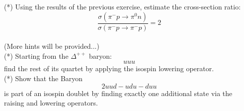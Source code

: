 \documentclass[12pt]{article}
\begin{document}
\exercise (*) Using the results of the previous exercise, estimate the cross-section ratio:
\begin{equation*}
  \frac{\sigma(\pi^- p \to \pi^0 n)}{\sigma(\pi^- p \to \pi^- p)} = 2
\end{equation*}\\[5pt]
(More hints will be provided...)\\[5pt]

\exercise (*)  Starting from the $\Delta^{++}$ baryon:
$$uuu$$
find the rest of its quartet by applying the isospin lowering operator.\\[5pt]

\exercise (*)  Show that the Baryon
$$ 2 uud - udu - duu $$
is part of an isospin doublet by finding exactly one additional state via the raising and lowering operators.\\[5pt]
\end{document}
